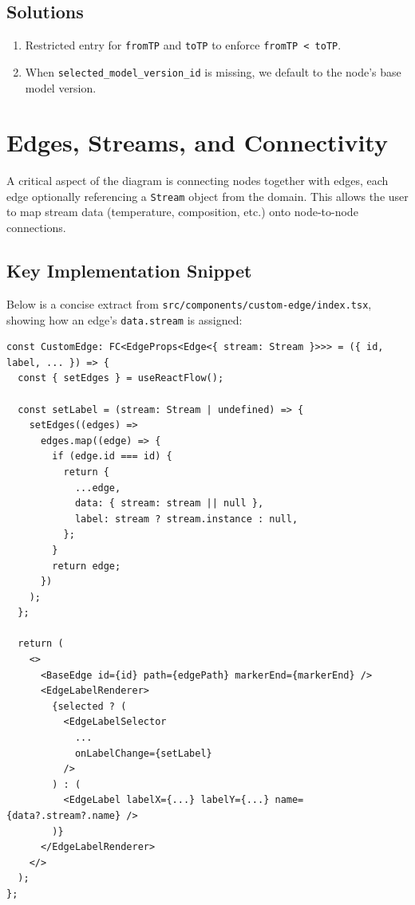 \documentclass{article}
\begin{document}
\subsection{Solutions}
\begin{enumerate}
  \item Restricted entry for \texttt{fromTP} and \texttt{toTP} to enforce \texttt{fromTP < toTP}. 
  \item When \texttt{selected\_model\_version\_id} is missing, we default to the node’s base model version.
\end{enumerate}

\section{Edges, Streams, and Connectivity}

A critical aspect of the diagram is connecting nodes together with edges, each edge optionally referencing a \texttt{Stream} object from the domain. This allows the user to map stream data (temperature, composition, etc.) onto node-to-node connections.

\subsection{Key Implementation Snippet}
Below is a concise extract from \texttt{src/components/custom-edge/index.tsx}, showing how an edge's \texttt{data.stream} is assigned:

\begin{verbatim}
const CustomEdge: FC<EdgeProps<Edge<{ stream: Stream }>>> = ({ id, label, ... }) => {
  const { setEdges } = useReactFlow();

  const setLabel = (stream: Stream | undefined) => {
    setEdges((edges) =>
      edges.map((edge) => {
        if (edge.id === id) {
          return {
            ...edge,
            data: { stream: stream || null },
            label: stream ? stream.instance : null,
          };
        }
        return edge;
      })
    );
  };

  return (
    <>
      <BaseEdge id={id} path={edgePath} markerEnd={markerEnd} />
      <EdgeLabelRenderer>
        {selected ? (
          <EdgeLabelSelector
            ...
            onLabelChange={setLabel}
          />
        ) : (
          <EdgeLabel labelX={...} labelY={...} name={data?.stream?.name} />
        )}
      </EdgeLabelRenderer>
    </>
  );
};
\end{verbatim}
\end{document}
